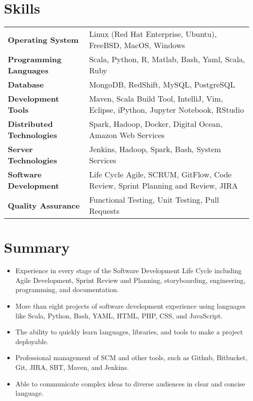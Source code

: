 \documentclass[10pt,a4paper]{article}
\begin{document}
  \newpage

\vspace*{-15mm}\section*{Skills}
  \noindent\begin{tabularx}{17cm}{l X}
    \textbf{Operating System} & Linux (Red Hat Enterprise, Ubuntu), FreeBSD, MacOS, Windows \\
    \textbf{Programming Languages} & Scala, Python, R, Matlab, Bash, Yaml, Scala, Ruby \\
    \textbf{Database} & MongoDB, RedShift, MySQL, PostgreSQL \\
    \textbf{Development Tools} & Maven, Scala Build Tool, IntelliJ, Vim, Eclipse, iPython, Jupyter Notebook, RStudio \\
    \textbf{Distributed Technologies} & Spark, Hadoop, Docker, Digital Ocean, Amazon Web Services \\
    \textbf{Server Technologies} & Jenkins, Hadoop, Spark, Bash, System Services \\
    \textbf{Software Development} & Life Cycle Agile, SCRUM, GitFlow, Code Review, Sprint Planning and Review, JIRA \\
    \textbf{Quality Assurance} & Functional Testing, Unit Testing, Pull Requests
  \end{tabularx}

\vspace*{3mm}\section*{Summary}
  \noindent\begin{minipage}{17cm}
    \noindent\begin{itemize}[leftmargin=6mm,topsep=0mm,itemsep=-1mm]
      \item Experience in every stage of the Software Development Life Cycle including Agile Development, Sprint Review and Planning, storyboarding, engineering, programming, and documentation.
      \item More than eight projects of software development experience using languages like Scala, Python, Bash, YAML, HTML, PHP, CSS, and JavaScript.
      \item The ability to quickly learn languages, libraries, and tools to make a project deployable. 
      \item Professional management of SCM and other tools, such as Github, Bitbucket, Git, JIRA, SBT, Maven, and Jenkins.
      \item Able to communicate complex ideas to diverse audiences in clear and concise language.
    \end{itemize}
  \end{minipage}
\end{document}
